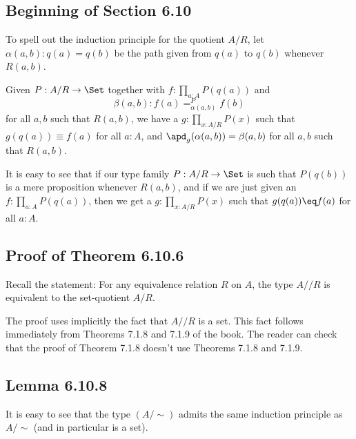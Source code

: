 \documentclass[12pt]{article}
\begin{document}
\subsection{Beginning of Section 6.10}\label{610}

To spell out the induction principle for the quotient $A/R$, let $\alpha(a,b):q(a)=q(b)$ be the path given from $q(a)$ to $q(b)$ whenever $R(a,b)$. 

Given $P:A/R\to\Set$ together with $f:\prod_{a:A}P(q(a))$ and 
$$
\beta(a,b):f(a)=^P_{\alpha(a,b)}f(b)
$$ 
for all $a,b$ such that $R(a,b)$, we have a $g:\prod_{x:A/R}P(x)$ such that $g(q(a))\equiv f(a)$ for all $a:A$, and $\apd_g(\alpha(a,b))=\beta(a,b)$ for all $a,b$ such that $R(a,b)$.

It is easy to see that if our type family $P:A/R\to\Set$ is such that $P(q(b))$ is a mere proposition whenever $R(a,b)$, and if we are just given an $f:\prod_{a:A}P(q(a))$, then we get a $g:\prod_{x:A/R}P(x)$ such that $g(q(a))\eq f(a)$ for all $a:A$.




\subsection{Proof of Theorem 6.10.6}

Recall the statement: For any equivalence relation $R$ on $A$, the type $A/\!\!/R$ is equivalent to the set-quotient $A/R$.

The proof uses implicitly the fact that $A/\!\!/R$ is a set. This fact follows immediately from Theorems 7.1.8 and 7.1.9 of the book. The reader can check that the proof of Theorem 7.1.8 doesn't use Theorems 7.1.8 and 7.1.9.


\subsection{Lemma 6.10.8}


It is easy to see that the type $(A/\sim)$ admits the same induction principle as $A/\sim$ (and in particular is a set).
\end{document}
